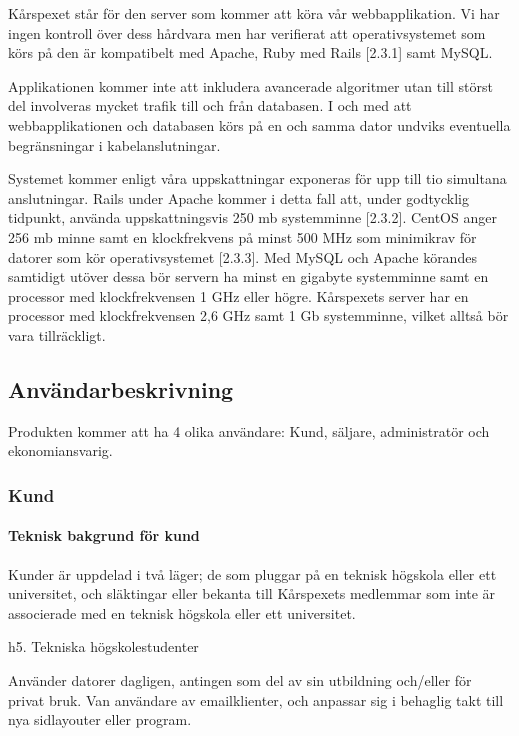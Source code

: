 \documentclass[a4paper, twoside, 11pt, titlepage]{article}
\begin{document}
		Kårspexet står för den server som kommer att köra vår webbapplikation. Vi har ingen kontroll över dess hårdvara men har verifierat att operativsystemet som körs på den är kompatibelt med Apache, Ruby med Rails [2.3.1] samt MySQL. 

		Applikationen kommer inte att inkludera avancerade algoritmer utan till störst del involveras mycket trafik till och från databasen. I och med att webbapplikationen och databasen körs på en och samma dator undviks eventuella begränsningar i kabelanslutningar.

		Systemet kommer enligt våra uppskattningar exponeras för upp till tio simultana anslutningar. Rails under Apache kommer i detta fall att, under godtycklig tidpunkt, använda uppskattningsvis 250 mb systemminne [2.3.2]. CentOS anger 256 mb minne samt en klockfrekvens på minst 500 MHz som minimikrav för datorer som kör operativsystemet [2.3.3]. Med MySQL och Apache körandes samtidigt utöver dessa bör servern ha minst en gigabyte systemminne samt en processor med klockfrekvensen 1 GHz eller högre. Kårspexets server har en processor med klockfrekvensen 2,6 GHz samt 1 Gb systemminne, vilket alltså bör vara tillräckligt.

	\subsection{Användarbeskrivning}


	Produkten kommer att ha 4 olika användare: Kund, säljare, administratör och ekonomiansvarig.

	\subsubsection{Kund}



			\paragraph{Teknisk bakgrund för kund}

			Kunder är uppdelad i två läger; de som pluggar på en teknisk högskola eller ett universitet, och släktingar eller bekanta till Kårspexets medlemmar som inte är associerade med en teknisk högskola eller ett universitet.

			h5. Tekniska högskolestudenter

			Använder datorer dagligen, antingen som del av sin utbildning och/eller för privat bruk. Van användare av emailklienter, och anpassar sig i behaglig takt till nya sidlayouter eller program. 
\end{document}

